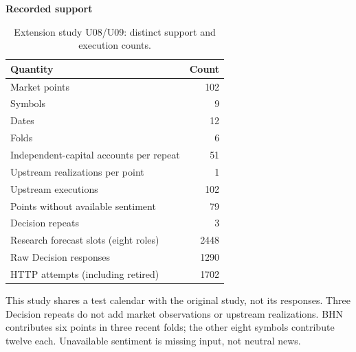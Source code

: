 \begin{table}[p]
\centering\small
\setlength{\tabcolsep}{3pt}
\renewcommand{\arraystretch}{1.12}
\caption{Extension study U08/U09: distinct support and execution counts.}
\label{tab:u09-scope}
\textbf{Recorded support}\par\smallskip
\begin{tabular}{lr}
\hline
Quantity & Count \\
\hline
Market points & 102 \\
Symbols & 9 \\
Dates & 12 \\
Folds & 6 \\
Independent-capital accounts per repeat & 51 \\
Upstream realizations per point & 1 \\
Upstream executions & 102 \\
Points without available sentiment & 79 \\
Decision repeats & 3 \\
Research forecast slots (eight roles) & 2448 \\
Raw Decision responses & 1290 \\
HTTP attempts (including retired) & 1702 \\
\hline
\end{tabular}\par\medskip
\begin{minipage}{\textwidth}\footnotesize This study shares a test calendar with the original study, not its responses. Three Decision repeats do not add market observations or upstream realizations. BHN contributes six points in three recent folds; the other eight symbols contribute twelve each. Unavailable sentiment is missing input, not neutral news.\end{minipage}
\end{table}
